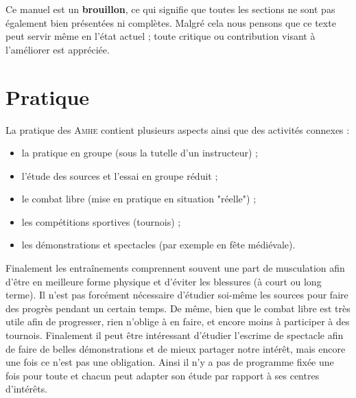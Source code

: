Ce manuel est un \textbf{brouillon}, ce qui signifie que toutes les sections ne sont pas également bien présentées ni complètes.
Malgré cela nous pensons que ce texte peut servir même en l'état actuel ; toute critique ou contribution visant à l'améliorer est appréciée.





\section{Pratique}


La pratique des \textsc{Amhe} contient plusieurs aspects ainsi que des activités connexes :
\begin{itemize}
	\item la pratique en groupe (sous la tutelle d'un instructeur) ;
	\item l'étude des sources et l'essai en groupe réduit ;
	\item le combat libre (mise en pratique en situation "réelle") ;
	\item les compétitions sportives (tournois) ;
	\item les démonstrations et spectacles (par exemple en fête médiévale).
\end{itemize}
Finalement les entraînements comprennent souvent une part de musculation afin d'être en meilleure forme physique et d'éviter les blessures (à court ou long terme).
Il n'est pas forcément nécessaire d'étudier soi-même les sources pour faire des progrès pendant un certain temps.
De même, bien que le combat libre est très utile afin de progresser, rien n'oblige à en faire, et encore moins à participer à des tournois.
Finalement il peut être intéressant d'étudier l'escrime de spectacle afin de faire de belles démonstrations et de mieux partager notre intérêt, mais encore une fois ce n'est pas une obligation.
Ainsi il n'y a pas de programme fixée une fois pour toute et chacun peut adapter son étude par rapport à ses centres d'intérêts.



